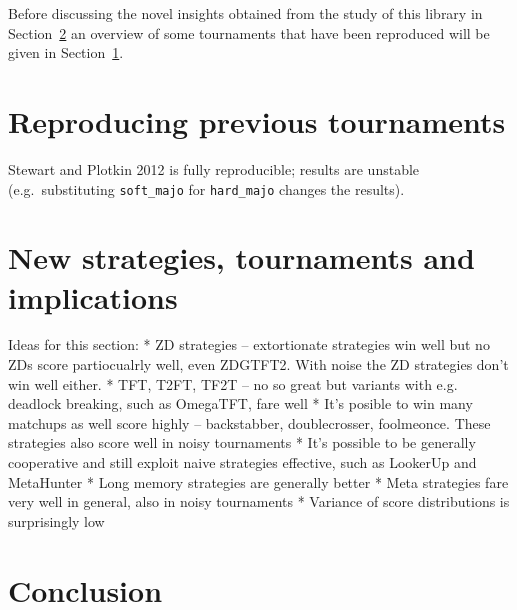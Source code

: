 \documentclass{article}
\begin{document}
Before discussing the novel insights obtained from the study of this library in
Section~\ref{sec:new-strategies-and-implications} an overview of some
tournaments that have been reproduced will be given in
Section~\ref{sec:reproducing-previous-tournaments}.

\section{Reproducing previous tournaments}\label{sec:reproducing-previous-tournaments}

Stewart and Plotkin 2012 is fully reproducible; results are unstable (e.g.\
substituting \texttt{soft\_majo} for \texttt{hard\_majo} changes the results).

\section{New strategies, tournaments and implications}\label{sec:new-strategies-and-implications}

Ideas for this section:
* ZD strategies -- extortionate strategies win well but no ZDs score partiocualrly well,
even ZDGTFT2. With noise the ZD strategies don't win well either.
* TFT, T2FT, TF2T -- no so great but variants with e.g. deadlock breaking, such as OmegaTFT,
fare well
* It's posible to win many matchups as well score highly -- backstabber, doublecrosser,
foolmeonce. These strategies also score well in noisy tournaments
* It's possible to be generally cooperative and still exploit naive strategies effective,
such as LookerUp and MetaHunter
* Long memory strategies are generally better
* Meta strategies fare very well in general, also in noisy tournaments
* Variance of score distributions is surprisingly low


\section{Conclusion}\label{sec:conclusion}

\printbibliography
\end{document}
